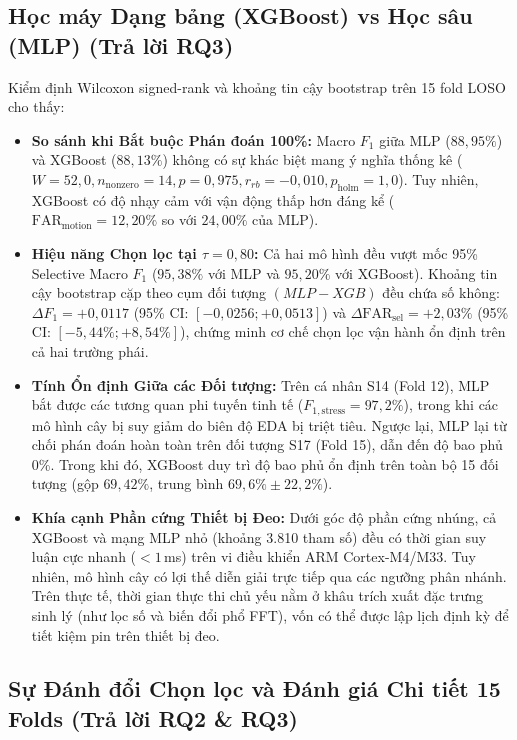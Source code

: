 \documentclass[conference]{IEEEtran}
\begin{document}
\subsection{Học máy Dạng bảng (XGBoost) vs Học sâu (MLP) (Trả lời RQ3)}
Kiểm định Wilcoxon signed-rank và khoảng tin cậy bootstrap trên 15 fold LOSO cho thấy:
\begin{itemize}
    \item \textbf{So sánh khi Bắt buộc Phán đoán 100\%:} Macro $F_1$ giữa MLP ($88,95\%$) và XGBoost ($88,13\%$) không có sự khác biệt mang ý nghĩa thống kê ($W = 52,0, n_{\text{nonzero}} = 14, p = 0,975, r_{rb} = -0,010, p_{\text{holm}} = 1,0$). Tuy nhiên, XGBoost có độ nhạy cảm với vận động thấp hơn đáng kể ($\text{FAR}_{\text{motion}} = 12,20\%$ so với $24,00\%$ của MLP).
    \item \textbf{Hiệu năng Chọn lọc tại $\tau = 0,80$:} Cả hai mô hình đều vượt mốc 95\% Selective Macro $F_1$ ($95,38\%$ với MLP và $95,20\%$ với XGBoost). Khoảng tin cậy bootstrap cặp theo cụm đối tượng $(MLP - XGB)$ đều chứa số không: $\Delta F_1 = +0,0117$ (95\% CI: $[-0,0256; +0,0513]$) và $\Delta \text{FAR}_{\text{sel}} = +2,03\%$ (95\% CI: $[-5,44\%; +8,54\%]$), chứng minh cơ chế chọn lọc vận hành ổn định trên cả hai trường phái.
    \item \textbf{Tính Ổn định Giữa các Đối tượng:} Trên cá nhân S14 (Fold 12), MLP bắt được các tương quan phi tuyến tinh tế ($F_{1,\text{stress}} = 97,2\%$), trong khi các mô hình cây bị suy giảm do biên độ EDA bị triệt tiêu. Ngược lại, MLP lại từ chối phán đoán hoàn toàn trên đối tượng S17 (Fold 15), dẫn đến độ bao phủ 0\%. Trong khi đó, XGBoost duy trì độ bao phủ ổn định trên toàn bộ 15 đối tượng (gộp $69,42\%$, trung bình $69,6\% \pm 22,2\%$).
    \item \textbf{Khía cạnh Phần cứng Thiết bị Đeo:} Dưới góc độ phần cứng nhúng, cả XGBoost và mạng MLP nhỏ (khoảng 3.810 tham số) đều có thời gian suy luận cực nhanh ($< 1$\,ms) trên vi điều khiển ARM Cortex-M4/M33. Tuy nhiên, mô hình cây có lợi thế diễn giải trực tiếp qua các ngưỡng phân nhánh. Trên thực tế, thời gian thực thi chủ yếu nằm ở khâu trích xuất đặc trưng sinh lý (như lọc số và biến đổi phổ FFT), vốn có thể được lập lịch định kỳ để tiết kiệm pin trên thiết bị đeo.
\end{itemize}

\subsection{Sự Đánh đổi Chọn lọc và Đánh giá Chi tiết 15 Folds (Trả lời RQ2 \& RQ3)}
\end{document}

